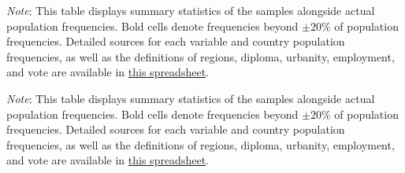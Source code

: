 %         

\begin{table}[h!]
    \caption[Sample representativeness in FR, DE, IT]{Sample representativeness in France, Germany, Italy. %
    } \label{tab:representativeness_1}
    \makebox[\textwidth][c]{
        \resizebox*{!}{.60\textheight}{%
        
        }
    }
    {\footnotesize \textit{Note}: This table displays summary statistics of the samples alongside actual population frequencies. Bold cells denote frequencies beyond $\pm 20\%$ of population frequencies. 
    Detailed sources for each variable and country population frequencies, as well as the definitions of regions, diploma, urbanity, employment, and vote are available in \href{https://github.com/bixiou/robustness_global_redistr/raw/main/questionnaire/sources.xlsx}{this spreadsheet}. 
    } 
\end{table}

\begin{table}[h!]
    \caption[Sample representativeness in PL, ES, GB, CH]{Sample representativeness in Poland, Spain, the UK, Switzerland. %
    } \label{tab:representativeness_2}
    \makebox[\textwidth][c]{\resizebox*{!}{.60\textheight}{}}
    {\footnotesize \textit{Note}: This table displays summary statistics of the samples alongside actual population frequencies. Bold cells denote frequencies beyond $\pm 20\%$ of population frequencies. 
    Detailed sources for each variable and country population frequencies, as well as the definitions of regions, diploma, urbanity, employment, and vote are available in \href{https://github.com/bixiou/robustness_global_redistr/raw/main/questionnaire/sources.xlsx}{this spreadsheet}. 
    } 
\end{table}


